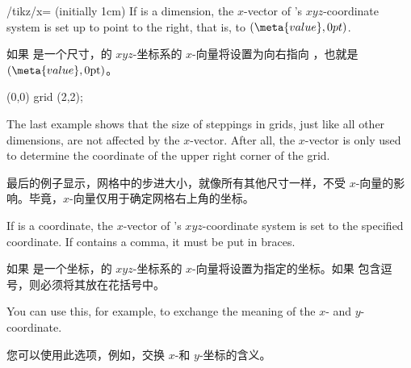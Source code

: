 \begin{key}{/tikz/x= (initially 1cm)}
    If  is a dimension, the $x$-vector of \pgfname's
    $xyz$-coordinate system is set up to point  to the right, that
    is, to $(\meta{value},0pt)$.

    如果  是一个尺寸，\pgfname 的 $xyz$-坐标系的 $x$-向量将设置为向右指向 ，也就是 $(\meta{value},0\mathrm{pt})$。

    \begin{codeexample}[]
\end{codeexample}

\begin{codeexample}[]
\tikz \draw[x=1.5cm] (0,0) grid (2,2);
\end{codeexample}

    The last example shows that the size of steppings in grids, just like all
    other dimensions, are not affected by the $x$-vector. After all, the
    $x$-vector is only used to determine the coordinate of the upper right
    corner of the grid.

    最后的例子显示，网格中的步进大小，就像所有其他尺寸一样，不受 $x$-向量的影响。毕竟，$x$-向量仅用于确定网格右上角的坐标。

    If  is a coordinate, the $x$-vector of \pgfname's
    $xyz$-coordinate system is set to the specified coordinate. If 
    contains a comma, it must be put in braces.

    如果  是一个坐标，\pgfname 的 $xyz$-坐标系的 $x$-向量将设置为指定的坐标。如果  包含逗号，则必须将其放在花括号中。

\begin{codeexample}[]
\end{codeexample}

    You can use this, for example, to exchange the meaning of the $x$- and
    $y$-coordinate.
    
    您可以使用此选项，例如，交换 $x$-和 $y$-坐标的含义。

\begin{codeexample}[]
\end{codeexample}
\end{key}

